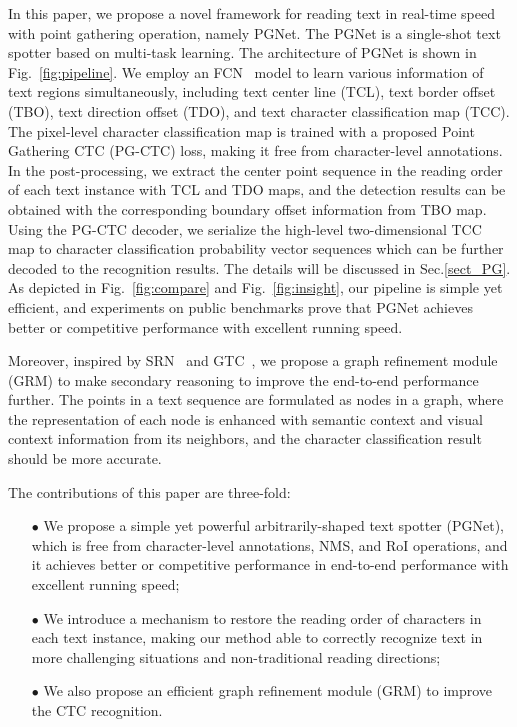 \documentclass[letterpaper]{article} \usepackage{aaai21}  \usepackage{times}  \usepackage{helvet} \usepackage{courier}  \usepackage[hyphens]{url}  \usepackage{graphicx} \urlstyle{rm} \def\UrlFont{\rm}  \usepackage{natbib}  \usepackage{caption} \usepackage{bm}
\begin{document}
In this paper, we propose a novel framework for reading text in real-time speed with point gathering operation, namely PGNet. The PGNet is a single-shot text spotter based on multi-task learning. The architecture of PGNet is shown in Fig.~\ref{fig:pipeline}. We employ an FCN~\cite{milletari2016v} model to learn various information of text regions simultaneously, including text center line (TCL), text border offset (TBO), text direction offset (TDO), and text character classification map (TCC). The pixel-level character classification map is trained with a proposed Point Gathering CTC (PG-CTC) loss, making it free from character-level annotations. In the post-processing, we extract the center point sequence in the reading order of each text instance with TCL and TDO maps, and the detection results can be obtained with the corresponding boundary offset information from TBO map. Using the PG-CTC decoder, we serialize the high-level two-dimensional TCC map to character classification probability vector sequences which can be further decoded to the recognition results. The details will be discussed in Sec.\ref{sect_PG}. As depicted in  Fig.~\ref{fig:compare} and Fig.~\ref{fig:insight}, our pipeline is simple yet efficient, and experiments on public benchmarks prove that PGNet achieves better or competitive performance with excellent running speed.

Moreover, inspired by SRN~\cite{yu2020accurate} and GTC~\cite{hu2020gtc}, we propose a graph refinement module (GRM) to  make secondary reasoning to improve the end-to-end performance further. The points in a text sequence are formulated as nodes in a graph, where the representation of each node is enhanced with semantic context and visual context information from its neighbors, and the character classification result should be more accurate. 

The contributions of this paper are three-fold: 
\begin{itemize}
\item[$\bullet$] We propose a simple yet powerful arbitrarily-shaped text spotter (PGNet), which is free from character-level annotations, NMS, and RoI operations, and it achieves better or competitive performance in end-to-end performance with excellent running speed;
\item[$\bullet$] We introduce a mechanism to restore the reading order of characters in each text instance, making our method able to correctly recognize text in more challenging situations and non-traditional reading directions;
\item[$\bullet$] We also propose an efficient graph refinement module (GRM) to improve the CTC recognition.
\end{itemize}
\end{document}
